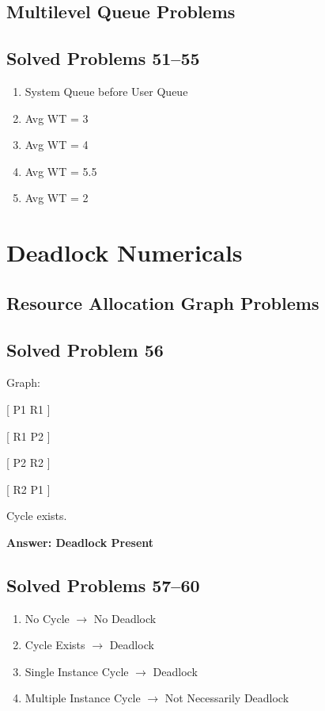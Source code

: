\subsection{Multilevel Queue Problems}

\subsection{Solved Problems 51--55}

\begin{enumerate}
\item System Queue before User Queue
\item Avg WT = 3
\item Avg WT = 4
\item Avg WT = 5.5
\item Avg WT = 2
\end{enumerate}

\section{Deadlock Numericals}

\subsection{Resource Allocation Graph Problems}

\subsection{Solved Problem 56}

Graph:

[
P1 \rightarrow R1
]

[
R1 \rightarrow P2
]

[
P2 \rightarrow R2
]

[
R2 \rightarrow P1
]

Cycle exists.

\textbf{Answer: Deadlock Present}

\subsection{Solved Problems 57--60}

\begin{enumerate}
\item No Cycle $\rightarrow$ No Deadlock
\item Cycle Exists $\rightarrow$ Deadlock
\item Single Instance Cycle $\rightarrow$ Deadlock
\item Multiple Instance Cycle $\rightarrow$ Not Necessarily Deadlock
\end{enumerate}

